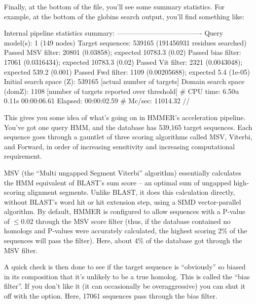 Finally, at the bottom of the file, you'll see some summary
statistics.  For example, at the bottom of the globins search output,
you'll find something like:

\begin{samepage}
\begin{sreoutput}
Internal pipeline statistics summary:
-------------------------------------
Query model(s):                              1  (149 nodes)
Target sequences:                       539165  (191456931 residues searched)
Passed MSV filter:                     20801  (0.03858); expected 10783.3 (0.02)
Passed bias filter:                    17061  (0.0316434); expected 10783.3 (0.02)
Passed Vit filter:                      2321  (0.0043048); expected 539.2 (0.001)
Passed Fwd filter:                      1109  (0.00205688); expected 5.4 (1e-05)
Initial search space (Z):             539165  [actual number of targets]
Domain search space  (domZ):            1108  [number of targets reported over threshold]
# CPU time: 6.50u 0.11s 00:00:06.61 Elapsed: 00:00:02.59
# Mc/sec: 11014.32
//
\end{sreoutput}
\end{samepage}

This gives you some idea of what's going on in HMMER's acceleration
pipeline. You've got one query HMM, and the database has 539,165
target sequences. Each sequence goes through a gauntlet of three
scoring algorithms called MSV, Viterbi, and Forward, in order of 
increasing sensitivity and increasing computational requirement. 

MSV (the ``Multi ungapped Segment Viterbi'' algorithm) essentially calculates
the HMM equivalent of BLAST's sum score -- an optimal sum of ungapped
high-scoring alignment segments. Unlike BLAST, it does this calculation
directly, without BLAST's word hit or hit extension step, using a SIMD
vector-parallel algorithm. By default, HMMER is configured to allow sequences
with a P-value of $\leq 0.02$ through the MSV score filter (thus, if the
database contained no homologs and P-values were accurately
calculated, the highest scoring 2\% of the sequences will pass the
filter). Here, about 4\% of the database got through the MSV filter.

A quick check is then done to see if the target sequence is
``obviously'' so biased in its composition that it's unlikely to be a
true homolog. This is called the ``bias filter''. If you don't like it
(it can occasionally be overaggressive) you can shut it off with the
 option. Here, 17061 sequences pass through the bias
filter.

